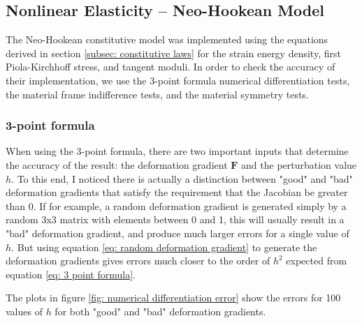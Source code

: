 \documentclass[]{spie}  %
\begin{document}
\subsection{Nonlinear Elasticity -- Neo-Hookean Model}
The Neo-Hookean constitutive model was implemented using the equations derived in section \ref{subsec: constitutive laws} for the strain energy density, first Piola-Kirchhoff stress, and tangent moduli. In order to check the accuracy of their implementation, we use the 3-point formula numerical differentiation tests, the material frame indifference tests, and the material symmetry tests. 

\subsubsection{3-point formula}
When using the 3-point formula, there are two important inputs that determine the accuracy of the result: the deformation gradient $\bm{F}$ and the perturbation value $h$. To this end, I noticed there is actually a distinction between "good" and "bad" deformation gradients that satisfy the requirement that the Jacobian be greater than 0. If for example, a random deformation gradient is generated simply by a random 3x3 matrix with elements between 0 and 1, this will usually result in a "bad" deformation gradient, and produce much larger errors for a single value of $h$. But using equation \ref{eq: random deformation gradient} to generate the deformation gradients gives errors much closer to the order of $h^2$ expected from equation \ref{eq: 3 point formula}. 

The plots in figure \ref{fig: numerical differentiation error} show the errors for 100 values of $h$ for both "good" and "bad" deformation gradients. 
\end{document}
